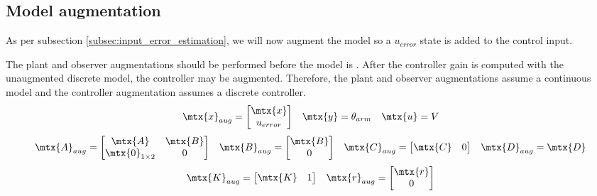 \subsection{Model augmentation}

As per subsection \ref{subsec:input_error_estimation}, we will now augment the
\gls{model} so a $u_{error}$ state is added to the \gls{control input}.

The \gls{plant} and \gls{observer} augmentations should be performed before the
\gls{model} is . After the \gls{controller}
gain is computed with the unaugmented discrete \gls{model}, the controller may
be augmented. Therefore, the \gls{plant} and \gls{observer} augmentations assume
a continuous \gls{model} and the \gls{controller} augmentation assumes a
discrete \gls{controller}.
\begin{equation*}
  \begin{array}{ccc}
    \mtx{x}_{aug} =
    \begin{bmatrix}
      \mtx{x} \\
      u_{error}
    \end{bmatrix} &
    \mtx{y} = \theta_{arm} &
    \mtx{u} = V
  \end{array}
\end{equation*}
\begin{equation}
  \begin{array}{cccc}
    \mtx{A}_{aug} =
    \begin{bmatrix}
      \mtx{A} & \mtx{B} \\
      \mtx{0}_{1 \times 2} & 0
    \end{bmatrix} &
    \mtx{B}_{aug} =
    \begin{bmatrix}
      \mtx{B} \\
      0
    \end{bmatrix} &
    \mtx{C}_{aug} =
    \begin{bmatrix}
      \mtx{C} & 0
    \end{bmatrix} &
    \mtx{D}_{aug} = \mtx{D}
  \end{array}
\end{equation}
\begin{equation}
  \begin{array}{cc}
    \mtx{K}_{aug} = \begin{bmatrix}
      \mtx{K} & 1
    \end{bmatrix} &
    \mtx{r}_{aug} = \begin{bmatrix}
      \mtx{r} \\
      0
    \end{bmatrix}
  \end{array}
\end{equation}

